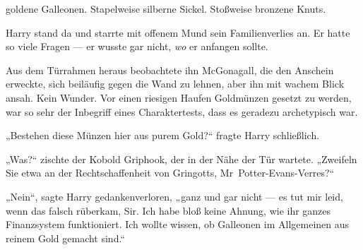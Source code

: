  goldene Galleonen. Stapelweise silberne Sickel. Stoßweise bronzene Knuts.

\hplettrineextrapara
Harry stand da und starrte mit offenem Mund sein Familienverlies an. Er hatte so viele Fragen — er wusste gar nicht, \emph{wo} er anfangen sollte.

Aus dem Türrahmen heraus beobachtete ihn McGonagall, die den Anschein erweckte, sich beiläufig gegen die Wand zu lehnen, aber ihn mit wachem Blick ansah. Kein Wunder. Vor einen riesigen Haufen Goldmünzen gesetzt zu werden, war so sehr der Inbegriff eines Charaktertests, dass es geradezu archetypisch war.

„Bestehen diese Münzen hier aus purem Gold?“ fragte Harry schließlich.

„Was?“ zischte der Kobold Griphook, der in der Nähe der Tür wartete.
„Zweifeln Sie etwa an der Rechtschaffenheit von Gringotts, Mr~Potter-Evans-Verres?“

„Nein“, sagte Harry gedankenverloren, „ganz und gar nicht — es tut mir leid, wenn das falsch rüberkam, Sir. Ich habe bloß keine Ahnung, wie ihr ganzes Finanzsystem funktioniert. Ich wollte wissen, ob Galleonen im Allgemeinen aus reinem Gold gemacht sind.“

